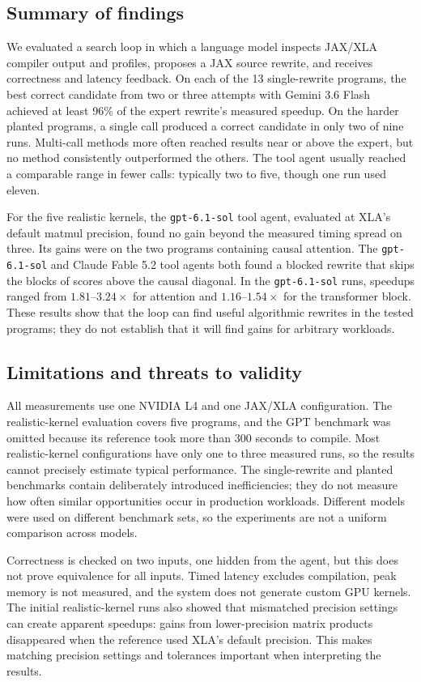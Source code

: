 \documentclass[conference]{IEEEtran}
\begin{document}
\subsection{Summary of findings}
We evaluated a search loop in which a language model inspects JAX/XLA compiler
output and profiles, proposes a JAX source rewrite, and receives correctness
and latency feedback. On each of the 13 single-rewrite programs, the best correct candidate
from two or three attempts with Gemini 3.6 Flash achieved at least 96\%
of the expert rewrite's measured speedup. On the harder
planted programs, a single call produced a correct candidate in only two of
nine runs. Multi-call methods more often reached results near or above the
expert, but no method consistently outperformed the others. The tool agent
usually reached a comparable range in fewer calls: typically two to five,
though one run used eleven.

For the five realistic kernels, the \texttt{gpt-6.1-sol} tool agent, evaluated
at XLA's default matmul precision, found no gain beyond the measured timing
spread on three. Its gains were on the two programs containing causal
attention. The \texttt{gpt-6.1-sol} and Claude Fable 5.2 tool agents both found
a blocked rewrite that skips the blocks of scores above the causal diagonal. In the
\texttt{gpt-6.1-sol} runs, speedups ranged from $1.81$--$3.24\times$ for
attention and $1.16$--$1.54\times$ for the transformer block. These results
show that the loop can find useful algorithmic rewrites in the tested
programs; they do not establish that it will find gains for arbitrary
workloads.

\subsection{Limitations and threats to validity}
All measurements use one NVIDIA L4 and one JAX/XLA configuration. The
realistic-kernel evaluation covers five programs, and the GPT benchmark was
omitted because its reference took more than 300 seconds to compile. Most
realistic-kernel configurations have only one to three measured runs, so the
results cannot precisely estimate typical performance. The single-rewrite
and planted benchmarks contain deliberately introduced inefficiencies; they
do not measure how often similar opportunities occur in production workloads.
Different models were used on different benchmark sets, so the experiments
are not a uniform comparison across models.

Correctness is checked on two inputs, one hidden from the agent, but this
does not prove equivalence for all inputs. Timed latency excludes compilation,
peak memory is not measured, and the system does not generate custom GPU
kernels. The initial realistic-kernel runs also showed that mismatched
precision settings can create apparent speedups: gains from lower-precision
matrix products disappeared when the reference used XLA's default precision.
This makes matching precision settings and tolerances important when
interpreting the results.
\end{document}
